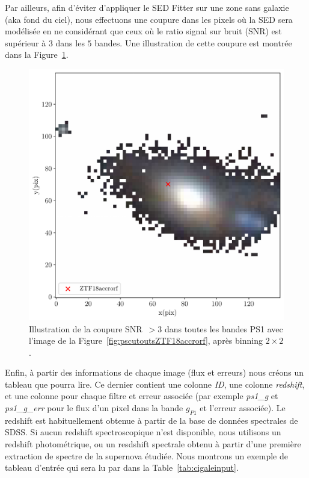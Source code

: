 \documentclass[../main/main.tex]{subfiles}
\begin{document}
Par ailleurs, afin d'éviter d'appliquer le SED Fitter sur une zone sans
galaxie (aka fond du ciel), nous effectuons une coupure dans les pixels
où la SED sera modélisée en ne considérant que ceux où le ratio signal
sur bruit (SNR) est supérieur à $3$ dans les $5$ bandes. Une
illustration de cette coupure est montrée dans la Figure~\ref{fig:pscutoutsZTF18accrorf_cutsnr}. 

\begin{figure}[ht]
  \begin{minipage}[c]{0.45\textwidth}
    \includegraphics[width=\textwidth]{../figures/05_sedfit/ps_cutouts_ZTF18accrorf_snrcut.pdf}
  \end{minipage}\hfill
  \begin{minipage}[c]{0.53\textwidth}
    \caption[Image RGB de PS1 avec coupure SNR]{Illustration de la
      coupure SNR~$>3$ dans toutes les bandes PS1 avec l'image de la
      Figure~\ref{fig:pscutoutsZTF18accrorf}, après binning $2\times2$.}\label{fig:pscutoutsZTF18accrorf_cutsnr}
  \end{minipage}
\end{figure}

Enfin, à partir des informations de chaque image (flux et
erreurs) nous créons un tableau que  pourra lire. Ce
dernier contient une colonne \textit{ID}, une colonne \textit{redshift},
et une colonne pour chaque filtre et erreur associée (par exemple
\textit{ps1\_g} et \textit{ps1\_g\_err} pour le flux d'un pixel dans la bande
$g_{P1}$ et l'erreur associée). Le redshift est habituellement obtenue à
partir de la base de données spectrales de SDSS. Si aucun redshift spectroscopique
n'est disponible, nous utilisons un redshift photométrique, ou un
resdshift spectrale obtenu à partir d'une première extraction de spectre
de la supernova étudiée. Nous montrons un exemple de tableau
d'entrée qui sera lu par  dans la
Table~\ref{tab:cigaleinput}.
\end{document}

